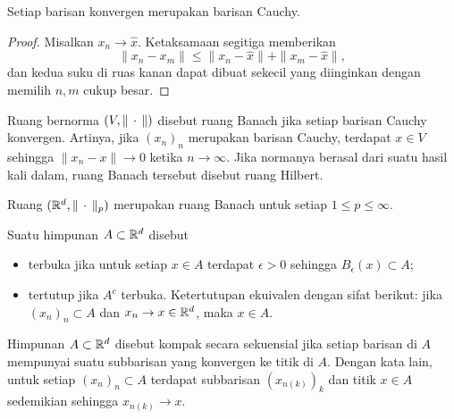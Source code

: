 \begin{theorem}
    Setiap barisan konvergen merupakan barisan Cauchy.
\end{theorem}

\begin{proof}
    Misalkan $x_n\rightarrow\hat x$. Ketaksamaan segitiga memberikan
    \begin{equation}
        \|x_n-x_m\|\leq\|x_n-\hat x\|+\|x_m-\hat x\|,
    \end{equation}
    dan kedua suku di ruas kanan dapat dibuat sekecil yang diinginkan dengan
    memilih $n,m$ cukup besar.
\end{proof}

\begin{defn}
    Ruang bernorma $(V,\|\,\cdot\,\|)$ disebut ruang Banach jika setiap barisan
    Cauchy konvergen. Artinya, jika $(x_n)_n$ merupakan barisan Cauchy, terdapat
    $x\in V$ sehingga $\|x_n-x\|\rightarrow0$ ketika $n\rightarrow\infty$.
    Jika normanya berasal dari suatu hasil kali dalam, ruang Banach tersebut
    disebut ruang Hilbert.
\end{defn}

\begin{example}
    Ruang $(\mathbb{R}^d,\|\,\cdot\,\|_p)$ merupakan ruang Banach untuk setiap
    $1\leq p\leq\infty$.
\end{example}

\begin{defn}
    Suatu himpunan $A\subset\mathbb{R}^d$ disebut
    \begin{itemize}
        \item terbuka jika untuk setiap $x\in A$ terdapat $\epsilon>0$ sehingga
        $B_\epsilon(x)\subset A$;
        \item tertutup jika $A^c$ terbuka. Ketertutupan ekuivalen dengan sifat
        berikut: jika $(x_n)_n\subset A$ dan $x_n\rightarrow x\in\mathbb{R}^d$, maka
        $x\in A$.
    \end{itemize}
\end{defn}

\begin{defn}
    Himpunan $A\subset\mathbb{R}^d$ disebut kompak secara sekuensial jika setiap
    barisan di $A$ mempunyai suatu subbarisan yang konvergen ke titik di $A$.
    Dengan kata lain, untuk setiap $(x_n)_n\subset A$ terdapat subbarisan
    $(x_{n(k)})_k$ dan titik $x\in A$ sedemikian sehingga
    $x_{n(k)}\rightarrow x$.
\end{defn}

